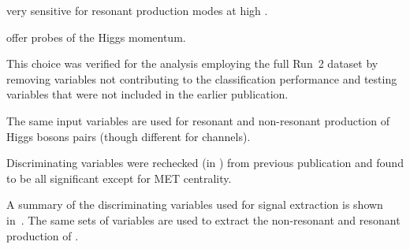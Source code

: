 \mHH very sensitive for resonant production modes at high \mX.



\dRtautau \dRbb offer probes of the Higgs momentum.


This choice was verified for the analysis employing the full Run~2
dataset by removing variables not contributing to the classification
performance and testing variables that were not included in the
earlier publication.



The same input variables are used for resonant and non-resonant
production of Higgs bosons pairs (though different for channels).


Discriminating variables were rechecked (in \hadhad) from previous
publication and found to be all significant except for MET centrality.






A summary of the discriminating variables used for signal extraction
is shown in~. The same sets of variables are
used to extract the non-resonant and resonant production of \HH.

